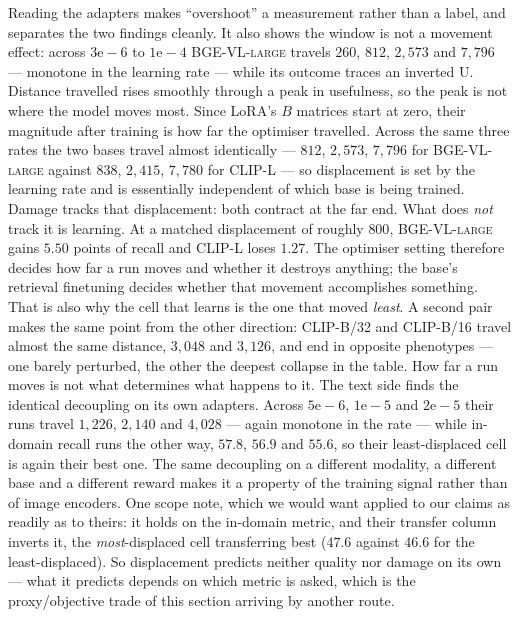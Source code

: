 Reading the adapters makes ``overshoot'' a measurement rather than a label, and separates the two
findings cleanly. It also shows the window is not a movement effect: across
$3\mathrm{e}{-}6$ to $1\mathrm{e}{-}4$ \textsc{BGE-VL-large} travels $260$, $812$, $2{,}573$ and
$7{,}796$ --- monotone in the learning rate --- while its outcome traces an inverted U. Distance
travelled rises smoothly through a peak in usefulness, so the peak is not where the model moves
most. Since LoRA's $B$ matrices start at zero, their magnitude after training is how
far the optimiser travelled. Across the same three rates the two bases travel almost identically
--- $812$, $2{,}573$, $7{,}796$ for \textsc{BGE-VL-large} against $838$, $2{,}415$, $7{,}780$ for
\textsc{CLIP-L} --- so displacement is set by the learning rate and is essentially independent of
which base is being trained. Damage tracks that displacement: both contract at the far end. What
does \emph{not} track it is learning. At a matched displacement of roughly $800$,
\textsc{BGE-VL-large} gains $5.50$ points of recall and \textsc{CLIP-L} loses $1.27$. The
optimiser setting therefore decides how far a run moves and whether it destroys anything; the
base's retrieval finetuning decides whether that movement accomplishes something. That is also
why the cell that learns is the one that moved \emph{least}. A second pair makes the same point
from the other direction: \textsc{CLIP-B/32} and \textsc{CLIP-B/16} travel almost the same
distance, $3{,}048$ and $3{,}126$, and end in opposite phenotypes --- one barely perturbed, the
other the deepest collapse in the table. How far a run moves is not what determines what happens
to it. The text side finds the identical decoupling on its own adapters. Across $5\mathrm{e}{-}6$,
$1\mathrm{e}{-}5$ and $2\mathrm{e}{-}5$ their runs travel $1{,}226$, $2{,}140$ and $4{,}028$ ---
again monotone in the rate --- while in-domain recall runs the other way, $57.8$, $56.9$ and
$55.6$, so their least-displaced cell is again their best one. The same decoupling on a different
modality, a different base and a different reward makes it a property of the training signal
rather than of image encoders. One scope note, which we would want applied to our claims as
readily as to theirs: it holds on the in-domain metric, and their transfer column inverts it, the
\emph{most}-displaced cell transferring best ($47.6$ against $46.6$ for the least-displaced). So
displacement predicts neither quality nor damage on its own --- what it predicts depends on which
metric is asked, which is the proxy/objective trade of this section arriving by another route.

